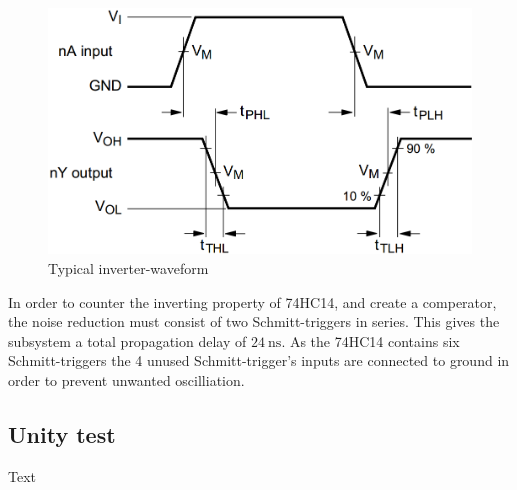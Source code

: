 \begin{figure}[H]
	\centering
	\includegraphics[width=0.5\linewidth]{Hardware/Pictures/74HC14_waveform}
	\caption{Typical inverter-waveform}
	\label{fig:SchmittTrigger_waveform}
\end{figure}

In order to counter the inverting property of 74HC14, and create a comperator, the noise reduction  must consist of two Schmitt-triggers in series. This gives the subsystem a total propagation delay of $\SI{24}{\nano \second}$. As the 74HC14 contains six Schmitt-triggers the 4 unused Schmitt-trigger's inputs are connected to ground in order to prevent unwanted oscilliation.

\subsection{Unity test}
Text